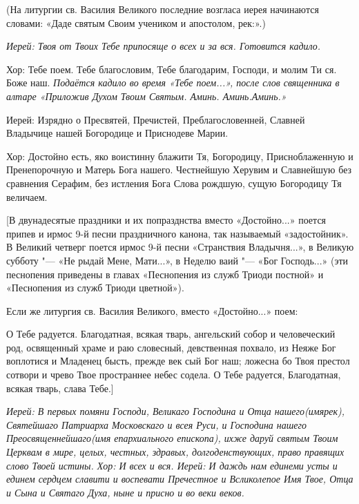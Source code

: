   (На литургии св. Василия Великого последние возгласа иерея начинаются словами: «Даде святым Своим учеником и апостолом, рек:».)


\itshape  Иерей:\normalfont{} Твоя от Твоих Тебе припосяще о всех и за вся. \itshape  Готовится кадило\normalfont{}. \itshape 


Хор:\normalfont{} Тебе поем. Тебе благословим, Тебе благодарим, Господи, и молим Ти ся. Боже наш. \itshape  Подаётся кадило во время «Тебе поем...», после слов священника в алтаре «Приложив Духом Твоим Святым. Аминь. Аминь.Аминь.\normalfont{}»  \itshape 


  Иерей:\normalfont{} Изрядно о Пресвятей, Пречистей, Преблагословенней, Славней Владычице нашей Богородице и Приснодеве Марии. \itshape 


Хор:\normalfont{} Достойно есть, яко воистинну блажити Тя, Богородицу, Присноблаженную и Пренепорочную и Матерь Бога нашего. Честнейшую Херувим и Славнейшую без сравнения Серафим, без истления Бога Слова рождшую, сущую Богородицу Тя величаем. 


 [В двунадесятые праздники и их попразднства вместо «Достойно...» поется припев и ирмос 9-й песни праздничного канона, так называемый «задостойник». В Великий четверг поется ирмос 9-й песни «Странствия Владычня...», в Великую субботу "--- «Не рыдай Мене, Мати...», в Неделю ваий "--- «Бог Господь...» (эти песнопения приведены в главах «Песнопения из служб Триоди постной» и «Песнопения из служб Триоди цветной»).


 Если же литургия св. Василия Великого, вместо «Достойно...» поем: 


      О Тебе радуется. Благодатная, всякая тварь, ангельский собор и человеческий род, освященный храме и раю словесный, девственная похвало, из Неяже Бог воплотися и Младенец бысть, прежде век сый Бог наш; ложесна бо Твоя престол сотвори и чрево Твое пространнее небес содела. О Тебе радуется, Благодатная, всякая тварь, слава Тебе.]


\itshape  Иерей:\normalfont{} В первых помяни Господи, Великаго Господина и Отца нашего\itshape  (имярек),\normalfont{} Святейшаго Патриарха Московскаго и всея Руси, и Господина нашего Преосвященнейшаго\itshape  (имя епархиального епископ\normalfont{}а), ихже даруй святым Твоим Церквам в мире, целых, честных, здравых, долгоденствующих, право правящих слово Твоей истины. \itshape  Хор:\normalfont{} И всех и вся. \itshape  Иерей:\normalfont{} И даждь нам единеми усты и единем сердцем славити и воспевати Пречестно\itshape е\normalfont{} и Всликолепое Имя Твое, Отца и Сына и Святаго Духа, ныне и присно и во веки веков. \itshape 

